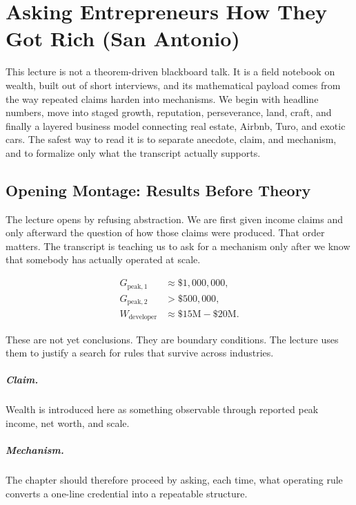 \chapter{Asking Entrepreneurs How They Got Rich (San Antonio)}

This lecture is not a theorem-driven blackboard talk. It is a field notebook on wealth, built out of short interviews, and its mathematical payload comes from the way repeated claims harden into mechanisms. We begin with headline numbers, move into staged growth, reputation, perseverance, land, craft, and finally a layered business model connecting real estate, Airbnb, Turo, and exotic cars. The safest way to read it is to separate anecdote, claim, and mechanism, and to formalize only what the transcript actually supports.

\section{Opening Montage: Results Before Theory}

The lecture opens by refusing abstraction. We are first given income claims and only afterward the question of how those claims were produced. That order matters. The transcript is teaching us to ask for a mechanism only after we know that somebody has actually operated at scale.

\begin{align}
G_{\text{peak},1} &\approx \$1{,}000{,}000,\\
G_{\text{peak},2} &> \$500{,}000,\\
W_{\text{developer}} &\approx \$15\text{M}-\$20\text{M}.
\end{align}

These are not yet conclusions. They are boundary conditions. The lecture uses them to justify a search for rules that survive across industries.

\paragraph{Claim.} Wealth is introduced here as something observable through reported peak income, net worth, and scale.

\paragraph{Mechanism.} The chapter should therefore proceed by asking, each time, what operating rule converts a one-line credential into a repeatable structure.

